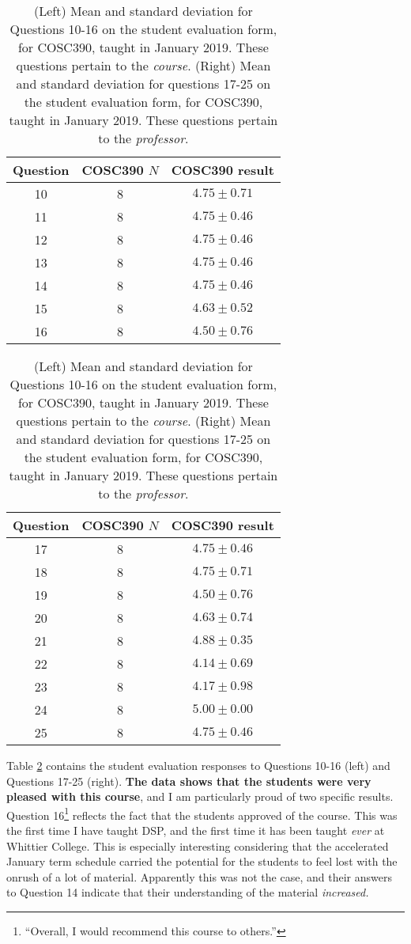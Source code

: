 \documentclass[../../main.tex]{subfiles}
\begin{document}
\label{sec:oof2}

\begin{table}
\small
\centering
\begin{tabular}{| c | c | c |}
\hline \hline
Question & COSC390 $N$ & COSC390 result \\ \hline
10 & 8 & $4.75\pm 0.71$ \\ \hline
11 & 8 & $4.75\pm 0.46$ \\ \hline
12 & 8 & $4.75\pm 0.46$ \\ \hline
13 & 8 & $4.75\pm 0.46$ \\ \hline
14 & 8 & $4.75\pm 0.46$ \\ \hline
15 & 8 & $4.63\pm 0.52$ \\ \hline
16 & 8 & $4.50\pm 0.76$ \\ \hline
\hline
\end{tabular}
\quad
\begin{tabular}{| c | c | c |}
\hline \hline
Question & COSC390 $N$ & COSC390 result \\ \hline
17 & 8 & $4.75\pm 0.46$ \\ \hline
18 & 8 & $4.75\pm 0.71$ \\ \hline
19 & 8 & $4.50\pm 0.76$ \\ \hline
20 & 8 & $4.63\pm 0.74$ \\ \hline
21 & 8 & $4.88\pm 0.35$ \\ \hline
22 & 8 & $4.14\pm 0.69$ \\ \hline
23 & 8 & $4.17\pm 0.98$ \\ \hline
24 & 8 & $5.00\pm 0.00$ \\ \hline
25 & 8 & $4.75\pm 0.46$ \\ \hline
\hline
\end{tabular}
\caption{\label{tab:courses:adv_eval_3} (Left) Mean and standard deviation for Questions 10-16 on the student evaluation form, for COSC390, taught in January 2019.  These questions pertain to the \textit{course}.  (Right) Mean and standard deviation for questions 17-25 on the student evaluation form, for COSC390, taught in January 2019.  These questions pertain to the \textit{professor}.}
\end{table}

Table \ref{tab:courses:adv_eval_3} contains the student evaluation responses to Questions 10-16 (left) and Questions 17-25 (right).  \textbf{The data shows that the students were very pleased with this course}, and I am particularly proud of two specific results.  Question 16\footnote{``Overall, I would recommend this course to others.''} reflects the fact that the students approved of the course.  This was the first time I have taught DSP, and the first time it has been taught \textit{ever} at Whittier College.  This is especially interesting considering that the accelerated January term schedule carried the potential for the students to feel lost with the onrush of a lot of material.  Apparently this was not the case, and their answers to Question 14 indicate that their understanding of the material \textit{increased.} \\ \hspace{0.1cm}
\end{document}
